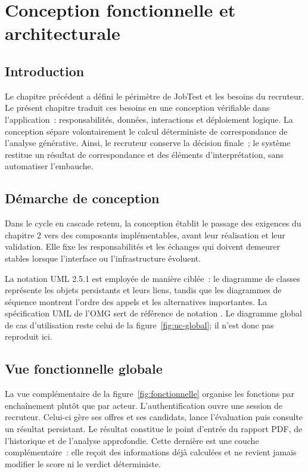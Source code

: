 \chapter{Conception fonctionnelle et architecturale}

\section*{Introduction}
Le chapitre précédent a défini le périmètre de JobTest et les besoins du recruteur. Le présent chapitre traduit ces besoins en une conception vérifiable dans l'application~: responsabilités, données, interactions et déploiement logique. La conception sépare volontairement le calcul déterministe de correspondance de l'analyse générative. Ainsi, le recruteur conserve la décision finale~; le système restitue un résultat de correspondance et des éléments d'interprétation, sans automatiser l'embauche.

\section{Démarche de conception}
Dans le cycle en cascade retenu, la conception établit le passage des exigences du chapitre 2 vers des composants implémentables, avant leur réalisation et leur validation. Elle fixe les responsabilités et les échanges qui doivent demeurer stables lorsque l'interface ou l'infrastructure évoluent.

La notation UML 2.5.1 est employée de manière ciblée~: le diagramme de classes représente les objets persistants et leurs liens, tandis que les diagrammes de séquence montrent l'ordre des appels et les alternatives importantes. La spécification UML de l'OMG sert de référence de notation \cite{omg_uml251}. Le diagramme global de cas d'utilisation reste celui de la figure~\ref{fig:uc-global}; il n'est donc pas reproduit ici.

\section{Vue fonctionnelle globale}
La vue complémentaire de la figure~\ref{fig:fonctionnelle} organise les fonctions par enchaînement plutôt que par acteur. L'authentification ouvre une session de recruteur. Celui-ci gère ses offres et ses candidats, lance l'évaluation puis consulte un résultat persistant. Le résultat constitue le point d'entrée du rapport PDF, de l'historique et de l'analyse approfondie. Cette dernière est une couche complémentaire~: elle reçoit des informations déjà calculées et ne revient jamais modifier le score ni le verdict déterministe.

